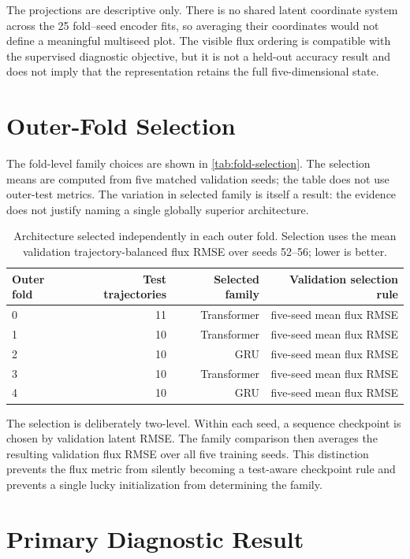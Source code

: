 The projections are descriptive only. There is no shared latent coordinate system across the 25
fold--seed encoder fits, so averaging their coordinates would not define a meaningful multiseed
plot. The visible flux ordering is compatible with the supervised diagnostic objective, but it is
not a held-out accuracy result and does not imply that the representation retains the full
five-dimensional state.

\section{Outer-Fold Selection}

The fold-level family choices are shown in \autoref{tab:fold-selection}. The selection means are
computed from five matched validation seeds; the table does not use outer-test metrics. The
variation in selected family is itself a result: the evidence does not justify naming a single
globally superior architecture.

\begin{table}[htbp]
  \centering
  \caption{Architecture selected independently in each outer fold. Selection uses the mean
  validation trajectory-balanced flux RMSE over seeds 52--56; lower is better.}
  \label{tab:fold-selection}
  \small
  \begin{tabular}{lrrr}
    \toprule
    Outer fold & Test trajectories & Selected family & Validation selection rule \\
    \midrule
    0 & 11 & Transformer & five-seed mean flux RMSE \\
    1 & 10 & Transformer & five-seed mean flux RMSE \\
    2 & 10 & GRU & five-seed mean flux RMSE \\
    3 & 10 & Transformer & five-seed mean flux RMSE \\
    4 & 10 & GRU & five-seed mean flux RMSE \\
    \bottomrule
  \end{tabular}
\end{table}

The selection is deliberately two-level. Within each seed, a sequence checkpoint is chosen by
validation latent RMSE. The family comparison then averages the resulting validation flux RMSE
over all five training seeds. This distinction prevents the flux metric from silently becoming a
test-aware checkpoint rule and prevents a single lucky initialization from determining the family.

\section{Primary Diagnostic Result}

